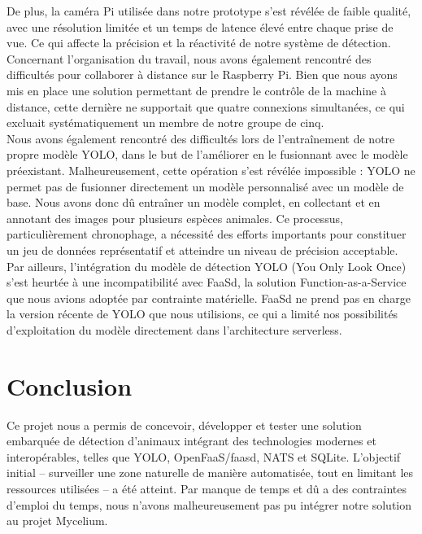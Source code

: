 \documentclass[a4paper,11pt]{article}
\begin{document}
	De plus, la caméra Pi utilisée dans notre prototype s’est révélée de faible qualité, avec une résolution limitée et un temps de latence élevé entre chaque prise de vue. Ce qui affecte la précision et la réactivité de notre système de détection.\\
	
	Concernant l'organisation du travail, nous avons également rencontré des difficultés pour collaborer à distance sur le Raspberry Pi. Bien que nous ayons mis en place une solution permettant de prendre le contrôle de la machine à distance, cette dernière ne supportait que quatre connexions simultanées, ce qui excluait systématiquement un membre de notre groupe de cinq.\\
	
	Nous avons également rencontré des difficultés lors de l'entraînement de notre propre modèle YOLO, dans le but de l’améliorer en le fusionnant avec le modèle préexistant. Malheureusement, cette opération s’est révélée impossible : YOLO ne permet pas de fusionner directement un modèle personnalisé avec un modèle de base. Nous avons donc dû entraîner un modèle complet, en collectant et en annotant des images pour plusieurs espèces animales. Ce processus, particulièrement chronophage, a nécessité des efforts importants pour constituer un jeu de données représentatif et atteindre un niveau de précision acceptable.\\
	
	Par ailleurs, l’intégration du modèle de détection YOLO (You Only Look Once) s’est heurtée à une incompatibilité avec FaaSd, la solution Function-as-a-Service que nous avions adoptée par contrainte matérielle. FaaSd ne prend pas en charge la version récente de YOLO que nous utilisions, ce qui a limité nos possibilités d’exploitation du modèle directement dans l’architecture serverless.
	

	\section{Conclusion}
	Ce projet nous a permis de concevoir, développer et tester une solution embarquée de détection d’animaux intégrant des technologies modernes et interopérables, telles que YOLO, OpenFaaS/faasd, NATS et SQLite. L’objectif initial – surveiller une zone naturelle de manière automatisée, tout en limitant les ressources utilisées – a été atteint. Par manque de temps et dû a des contraintes d'emploi du temps, nous n'avons malheureusement pas pu intégrer notre solution au projet Mycelium.
	
\end{document}
